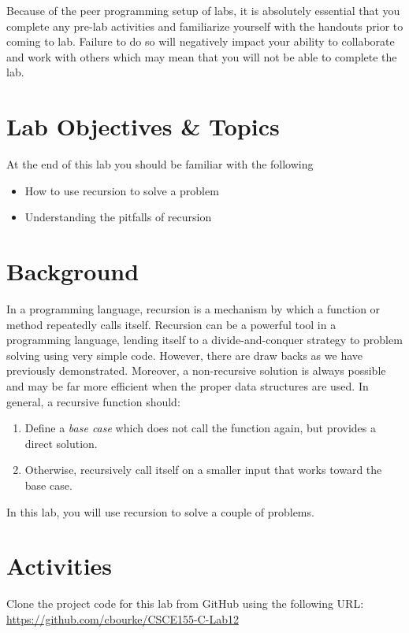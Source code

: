 \documentclass[12pt]{scrartcl}
\begin{document}
Because of the peer programming setup of labs, it is absolutely 
essential that you complete any pre-lab activities and familiarize
yourself with the handouts prior to coming to lab.  Failure to do
so will negatively impact your ability to collaborate and work with 
others which may mean that you will not be able to complete the
lab.  

\section{Lab Objectives \& Topics}
At the end of this lab you should be familiar with the following
\begin{itemize}
  \item How to use recursion to solve a problem
  \item Understanding the pitfalls of recursion
\end{itemize}

\section{Background}

In a programming language, recursion is a mechanism by which 
a function or method repeatedly calls itself.  Recursion can be a 
powerful tool in a programming language, lending itself to a 
divide-and-conquer strategy to problem solving using very simple 
code.  However, there are draw backs as we have previously 
demonstrated.  Moreover, a non-recursive solution is always 
possible and may be far more efficient when the proper data 
structures are used.  In general, a recursive function should:
\begin{enumerate}
  \item Define a \emph{base case} which does not call the 
	function again, but provides a direct solution.
  \item Otherwise, recursively call itself on a smaller input that 
	works toward the base case. 
\end{enumerate}
	
In this lab, you will use recursion to solve a couple of problems.

\section{Activities}

Clone the project code for this lab from GitHub using the following 
URL: \url{https://github.com/cbourke/CSCE155-C-Lab12}
\end{document}
